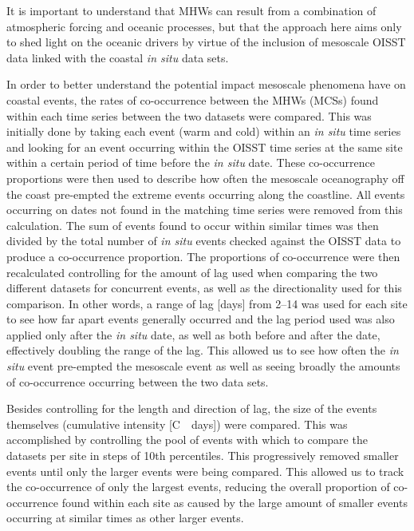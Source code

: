 \documentclass[a4paper,10pt,review]{elsarticle}
\begin{document}
It is important to understand that MHWs can result from a combination of atmospheric forcing and oceanic processes, but that the approach here aims only to shed light on the oceanic drivers by virtue of the inclusion of mesoscale OISST data linked with the coastal \emph{in situ} data sets.

In order to better understand the potential impact mesoscale phenomena have on coastal events, the rates of co-occurrence between the MHWs (MCSs) found within each time series between the two datasets were compared. This was initially done by taking each event (warm and cold) within an \emph{in situ} time series and looking for an event occurring within the OISST time series at the same site within a certain period of time before the \emph{in situ} date. These co-occurrence proportions were then used to describe how often the mesoscale oceanography off the coast pre-empted the extreme events occurring along the coastline. All events occurring on dates not found in the matching time series were removed from this calculation. The sum of events found to occur within similar times was then divided by the total number of \emph{in situ} events checked against the OISST data to produce a co-occurrence proportion. The proportions of co-occurrence were then recalculated controlling for the amount of lag used when comparing the two different datasets for concurrent events, as well as the directionality used for this comparison. In other words, a range of lag [days] from 2--14 was used for each site to see how far apart events generally occurred and the lag period used was also applied only after the \emph{in situ} date, as well as both before and after the date, effectively doubling the range of the lag. This allowed us to see how often the \emph{in situ} event pre-empted the mesoscale event as well as seeing broadly the amounts of co-occurrence occurring between the two data sets.

Besides controlling for the length and direction of lag, the size of the events themselves (cumulative intensity [\degree C~\texttimes~days]) were compared. This was accomplished by controlling the pool of events with which to compare the datasets per site in steps of 10th percentiles. This progressively removed smaller events until only the larger events were being compared. This allowed us to track the co-occurrence of only the largest events, reducing the overall proportion of co-occurrence found within each site as caused by the large amount of smaller events occurring at similar times as other larger events.
\end{document}
